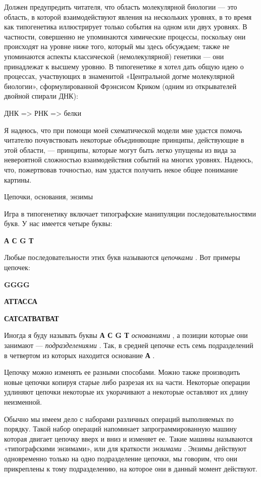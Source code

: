 Должен предупредить читателя, что область молекулярной биологии --- это область, в которой взаимодействуют явления на нескольких уровнях, в то время как типогенетика иллюстрирует только события на одном или двух уровнях. В частности, совершенно не упоминаются химические процессы, поскольку они происходят на уровне ниже того, который мы здесь обсуждаем; также не упоминаются аспекты классической (немолекулярной) генетики --- они принадлежат к высшему уровню. В типогенетике я хотел дать общую идею о процессах, участвующих в знаменитой «Центральной догме молекулярной биологии», сформулированной Фрэнсисом Криком (одним из открывателей двойной спирали ДНК):

ДНК =\textgreater{} РНК =\textgreater{} белки

Я надеюсь, что при помощи моей схематической модели мне удастся помочь читателю почувствовать некоторые объединяющие принципы, действующие в этой области, --- принципы, которые могут быть легко упущены из вида за невероятной сложностью взаимодействия событий на многих уровнях. Надеюсь, что, пожертвовав точностью, нам удастся получить некое общее понимание картины.

Цепочки, основания, энзимы

Игра в типогенетику включает типографские манипуляции последовательностями букв. У нас имеется четыре буквы:

\textbf{А С G Т}

Любые последовательности этих букв называются \emph{цепочками} . Вот примеры цепочек:

\textbf{GGGG}

\textbf{АТТАССА}

\textbf{САТСАТВАТВАТ}

Иногда я буду называть буквы \textbf{А С G Т} \emph{основаниями} , а позиции которые они занимают --- \emph{подразделениями} . Так, в средней цепочке есть семь подразделений в четвертом из которых находится основание \textbf{А} .

Цепочку можно изменять ее разными способами. Можно также производить новые цепочки копируя старые либо разрезая их на части. Некоторые операции удлиняют цепочки некоторые их укорачивают а некоторые оставляют их длину неизменной.

Обычно мы имеем дело с наборами различных операций выполняемых по порядку. Такой набор операций напоминает запрограммированную машину которая двигает цепочку вверх и вниз и изменяет ее. Такие машины называются «типографскими энзимами», или для краткости \emph{энзимами} . Энзимы действуют одновременно только на одно подразделение цепочки, мы говорим, что они прикреплены к тому подразделению, на которое они в данный момент действуют.

